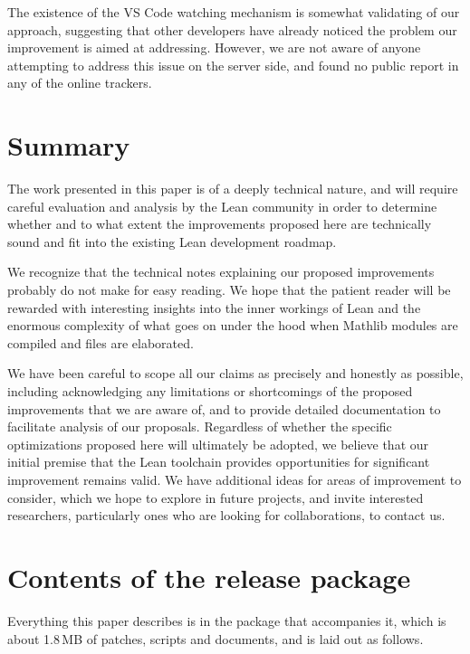 \documentclass{article}
\newcommand{\Lean}{Lean\xspace}      %
\newcommand{\mathlib}{Mathlib\xspace}
\begin{document}
The existence of the VS Code watching mechanism is somewhat validating of our approach, suggesting that other developers have already noticed the problem our improvement is aimed at addressing. However, we are not aware of anyone attempting to address this issue on the server side, and found no public report in any of the online trackers.

\section{Summary}

The work presented in this paper is of a deeply technical nature, and will require careful evaluation and analysis by the \Lean community in order to determine whether and to what extent the improvements proposed here are technically sound and fit into the existing \Lean development roadmap. 

We recognize that the technical notes explaining our proposed improvements probably do not make for easy reading. We hope that the patient reader will be rewarded with interesting insights into the inner workings of \Lean and the enormous complexity of what goes on under the hood when \mathlib modules are compiled and files are elaborated.

We have been careful to scope all our claims as precisely and honestly as possible, including acknowledging any limitations or shortcomings of the proposed improvements that we are aware of, and to provide detailed documentation to facilitate analysis of our proposals. Regardless of whether the specific optimizations proposed here will ultimately be adopted, we believe that our initial premise that the \Lean toolchain provides opportunities for significant improvement remains valid. We have additional ideas for areas of improvement to consider, which we hope to explore in future projects, and invite interested researchers, particularly ones who are looking for collaborations, to contact us.

\appendix

\section{Contents of the release package}
\label{app:release}

Everything this paper describes is in the package that accompanies it, which is about 1.8\,MB of
patches, scripts and documents, and is laid out as follows.
\end{document}
